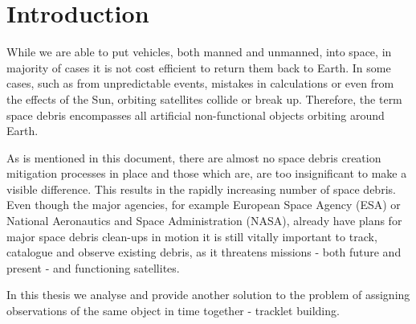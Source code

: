\chapter{Introduction}\label{chap:intro}
	
	While we are able to put vehicles, both manned and unmanned, into space, in majority of cases it is not cost efficient to return them back to Earth. In some cases, such as from unpredictable events, mistakes in calculations or even from the effects of the Sun, orbiting satellites collide or break up. Therefore, the term space debris encompasses all artificial non-functional objects orbiting around Earth.

	As is mentioned in this document, there are almost no space debris creation mitigation processes in place and those which are, are too insignificant to make a visible difference. This results in the rapidly increasing number of space debris. Even though the major agencies, for example European Space Agency (ESA) or National Aeronautics and Space Administration (NASA), already have plans for major space debris clean-ups in motion it is still vitally important to track, catalogue and observe existing debris, as it threatens missions - both future and present - and functioning satellites.

	In this thesis we analyse and provide another solution to the problem of assigning observations of the same object in time together - tracklet building.